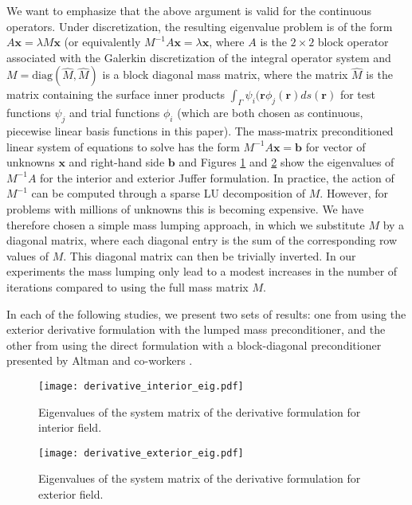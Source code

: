 We want to emphasize that the above argument is valid for the continuous operators. Under discretization, the resulting eigenvalue problem is of the form $A\mathbf{x}=\lambda M\mathbf{x}$ (or equivalently $M^{-1}A\mathbf{x}=\lambda \mathbf{x}$, where $A$ is the $2\times 2$ block operator associated with the Galerkin discretization of the integral operator system and $M = \text{diag}(\hat{M}, \hat{M})$ is a block diagonal mass matrix, where the matrix $\hat{M}$ is the matrix containing the surface inner products $\int_{\Gamma}\psi_i(\mathbf{r}\phi_j(\mathbf{r})ds(\mathbf{r})$ for test functions $\psi_j$ and trial functions $\phi_i$ (which are both chosen as continuous, piecewise linear basis functions in this paper). The mass-matrix preconditioned linear system of equations to solve has the form $M^{-1}A\mathbf{x} = \mathbf{b}$ for vector of unknowns $\mathbf{x}$ and right-hand side $\mathbf{b}$ and Figures \ref{fig:derivative_interior_eig} and \ref{fig:derivative_exterior_eig} show the eigenvalues of $M^{-1}A$ for the interior and exterior Juffer formulation. In practice, the action of $M^{-1}$ can be computed through a sparse LU decomposition of $M$. However, for problems with millions of unknowns this is becoming expensive. We have therefore chosen a simple mass lumping approach, in which we substitute $M$ by a diagonal matrix, where each diagonal entry is the sum of the corresponding row values of $M$. This diagonal matrix can then be trivially inverted. In our experiments the mass lumping only lead to a modest increases in the number of iterations compared to using the full mass matrix $M$.

In each of the following studies, we present two sets of results: one from using the exterior derivative formulation with the lumped mass preconditioner, and the other from using the direct formulation with a block-diagonal preconditioner presented by Altman and co-workers \cite{AltmanBardhanWhiteTidor2009}.

\begin{figure}%
    \centering
    \texttt{[image: derivative\_interior\_eig.pdf]}
    \caption{Eigenvalues of the system matrix of the derivative formulation for interior field.}
    \label{fig:derivative_interior_eig}
\end{figure}

\begin{figure}%
    \centering
    \texttt{[image: derivative\_exterior\_eig.pdf]}
    \caption{Eigenvalues of the system matrix of the derivative formulation for exterior field.}
    \label{fig:derivative_exterior_eig}
\end{figure}

